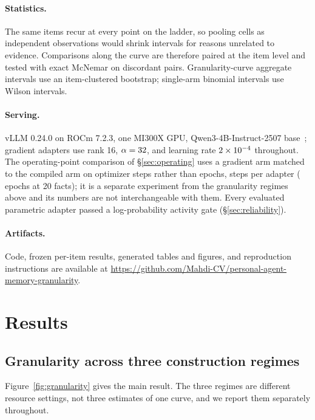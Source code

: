 \documentclass{article}
\begin{document}
\paragraph{Statistics.} The same \NPerArm{} items recur at every point on the
ladder, so pooling cells as independent observations would shrink intervals for
reasons unrelated to evidence. Comparisons along the curve are therefore paired at
the item level and tested with exact McNemar on discordant pairs. Granularity-curve
aggregate intervals use an item-clustered bootstrap; single-arm binomial intervals
use Wilson intervals.

\paragraph{Serving.} vLLM 0.24.0 on ROCm 7.2.3, one MI300X GPU,
Qwen3-4B-Instruct-2507 base~\citep{qwen3,qwen3-4b-2507}; gradient adapters use
rank 16, $\alpha=32{}$, and
learning rate $2\times10^{-4}{}$ throughout. The operating-point comparison of
\S\ref{sec:operating} uses a gradient arm matched to the compiled arm on optimizer
steps rather than epochs, \SgdOptSteps{} steps per adapter (\SgdEpochs{} epochs at
20 facts); it is a separate experiment from the granularity regimes above and its
numbers are not interchangeable with them. Every evaluated parametric adapter
passed a log-probability activity gate
(\S\ref{sec:reliability}).

\paragraph{Artifacts.} Code, frozen per-item results, generated tables and
figures, and reproduction instructions are available at
\url{https://github.com/Mahdi-CV/personal-agent-memory-granularity}.

\section{Results}
\label{sec:results}

\subsection{Granularity across three construction regimes}
\label{sec:curve}

Figure~\ref{fig:granularity} gives the main result. The three regimes are
different resource settings, not three estimates of one curve, and we report them
separately throughout.
\end{document}
